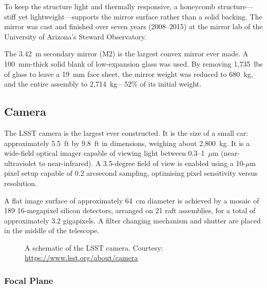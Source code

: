 \documentclass[12pt,a4paper]{article}
\begin{document}
To keep the structure light and thermally responsive, a honeycomb structure---
stiff yet lightweight---supports the mirror surface rather than a solid backing.
The mirror was cast and finished over seven years (2008--2015) at the mirror
lab of the University of Arizona's Steward Observatory.

The 3.42~m secondary mirror (M2) is the largest convex mirror ever made. A
100~mm-thick solid blank of low-expansion glass was used. By removing 1{,}735~lbs
of glass to leave a 19~mm face sheet, the mirror weight was reduced to 680~kg,
and the entire assembly to 2{,}714~kg---52\% of its initial weight.

\subsection{Camera}

The LSST camera is the largest ever constructed. It is the size of a small
car: approximately 5.5~ft by 9.8~ft in dimensions, weighing about 2{,}800~kg.
It is a wide-field optical imager capable of viewing light between
0.3--1~$\mu$m (near-ultraviolet to near-infrared). A 3.5-degree field of view
is enabled using a 10-$\mu$m pixel setup capable of 0.2 arcsecond sampling,
optimising pixel sensitivity versus resolution.

A flat image surface of approximately 64~cm diameter is achieved by a mosaic
of 189 16-megapixel silicon detectors, arranged on 21 raft assemblies, for a
total of approximately 3.2 gigapixels. A filter changing mechanism and shutter
are placed in the middle of the telescope.

\begin{figure}[htbp]
  \centering
  \caption{A schematic of the LSST camera.
           Courtesy: \url{https://www.lsst.org/about/camera}}
  \label{fig:camera}
\end{figure}

\subsubsection{Focal Plane}
\end{document}
